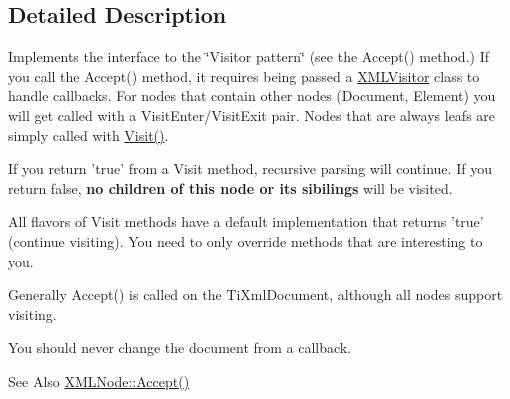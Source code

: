 \subsection{Detailed Description}
Implements the interface to the \char`\"{}\-Visitor pattern\char`\"{} (see the Accept() method.) If you call the Accept() method, it requires being passed a \hyperlink{classtinyxml2_1_1_x_m_l_visitor}{X\-M\-L\-Visitor} class to handle callbacks. For nodes that contain other nodes (Document, Element) you will get called with a Visit\-Enter/\-Visit\-Exit pair. Nodes that are always leafs are simply called with \hyperlink{classtinyxml2_1_1_x_m_l_visitor_aa5fe1cd9e5e524c6b488eba033a6f683}{Visit()}.

If you return 'true' from a Visit method, recursive parsing will continue. If you return false, {\bfseries no children of this node or its sibilings} will be visited.

All flavors of Visit methods have a default implementation that returns 'true' (continue visiting). You need to only override methods that are interesting to you.

Generally Accept() is called on the Ti\-Xml\-Document, although all nodes support visiting.

You should never change the document from a callback.

\begin{DoxySeeAlso}{See Also}
\hyperlink{classtinyxml2_1_1_x_m_l_node_a22a4129c1b347686a3579664d9278cce}{X\-M\-L\-Node\-::\-Accept()} 
\end{DoxySeeAlso}
